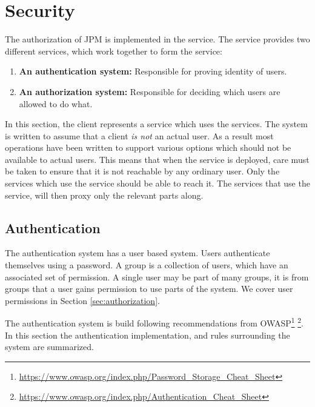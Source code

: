 \section{Security}

The authorization of JPM is implemented in the \security service. The \security
service provides two different services, which work together to form the
\security service:

\begin{enumerate}

    \item \textbf{An authentication system:} Responsible for proving identity
        of users.

    \item \textbf{An authorization system:} Responsible for deciding which
        users are allowed to do what.

\end{enumerate}

In this section, the client represents a service which uses the \security
services. The system is written to assume that a client \emph{is not} an actual
user. As a result most operations have been written to support various options
which should not be available to actual users. This means that when the
\security service is deployed, care must be taken to ensure that it is not
reachable by any ordinary user. Only the services which use the \security
service should be able to reach it. The services that use the \security
service, will then proxy only the relevant parts along.

\subsection{Authentication}
\label{sec:authentication}

The authentication system has a user based system. Users authenticate
themselves using a password. A group is a collection of users, which have an
associated set of permission. A single user may be part of many groups, it is
from groups that a user gains permission to use parts of the system. We cover
user permissions in Section \ref{sec:authorization}.

The authentication system is build following recommendations from
OWASP\footnote{
    \url{https://www.owasp.org/index.php/Password_Storage_Cheat_Sheet} }
    \footnote{\url{https://www.owasp.org/index.php/Authentication_Cheat_Sheet}
    }. In this section the authentication implementation, and rules surrounding
the system are summarized.

